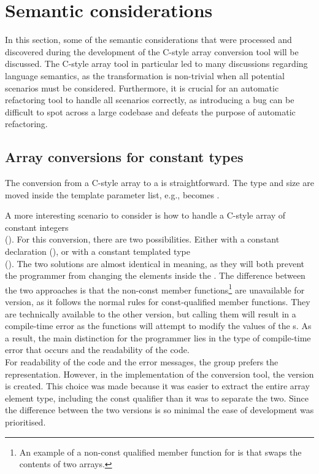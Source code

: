 
\section{Semantic considerations}
In this section, some of the semantic considerations that were processed and discovered during the development of the C-style array conversion tool will be discussed.
The C-style array tool in particular led to many discussions regarding language semantics, as the transformation is non-trivial when all potential scenarios must be considered.
Furthermore, it is crucial for an automatic refactoring tool to handle all scenarios correctly, as introducing a bug can be difficult to spot across a large codebase and defeats the purpose of automatic refactoring.

\subsection{Array conversions for constant types} \label{subsec:095:030:array_conversions}

The conversion from a C-style  array to a  is straightforward. The type and size are moved inside the template parameter list, e.g.,  becomes .

A more interesting scenario to consider is how to handle a C-style array of constant integers\\
(). For this conversion, there are two possibilities. Either with a constant  declaration
(), or with a constant templated type\\
().
The two solutions are almost identical in meaning, as they will both prevent the programmer from changing the elements inside the .
The difference between the two approaches is that the non-const member functions\footnote{
    An example of a non-const qualified member function for  is  that swaps the contents of two arrays.
} are unavailable for  version, as it follows the normal rules for const-qualified member functions.
They are technically available to the other version, but calling them will result in a compile-time error as the functions will attempt to modify the values of the s.
As a result, the main distinction for the programmer lies in the type of compile-time error that occurs and the readability of the code.\\
For readability of the code and the error messages, the group prefers the  representation.
However, in the implementation of the conversion tool, the  version is created. This choice was made because it was easier to extract the entire array element type, including the const qualifier than it was to separate the two.
Since the difference between the two versions is so minimal the ease of development was prioritised.

